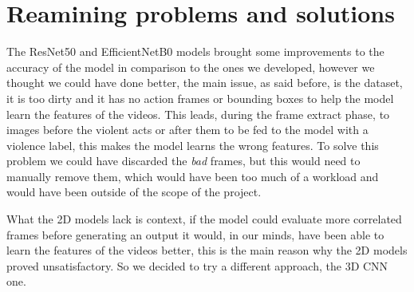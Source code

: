 \section{Reamining problems and solutions} 
The ResNet50 and EfficientNetB0 models brought some improvements to the accuracy of the model in comparison to the ones we developed, however we thought we could have done better, the main issue, as said before, is the dataset, it is too dirty and it has no action frames or bounding boxes to help the model learn the features of the videos. This leads, during the frame extract phase, to images before the violent acts or after them to be fed to the model with a violence label, this makes the model learns the wrong features. To solve this problem we could have discarded the \textit{bad} frames, but this would need to manually remove them, which would have been too much of a workload and would have been outside of the scope of the project.

    What the 2D models lack is context, if the model could evaluate more correlated frames before generating an output it would, in our minds, have been able to learn the features of the videos better, this is the main reason why the 2D models proved unsatisfactory. So we decided to try a different approach, the 3D CNN one.